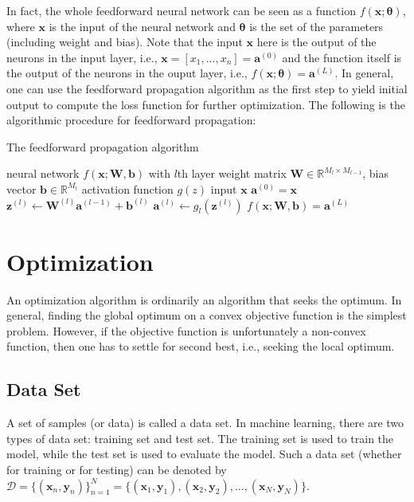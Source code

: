 \documentclass[
	parskip, 			   %
	twoside, 			   %
	DIV=14, 			   %
	BCOR=15.0mm, 		   %
	headsepline, 		   %
	open=right, 		   %
	captions=tableheading, %
	bibliography=totoc,    %
	numbers=noenddot       %
]{scrreprt}
\begin{document}
In fact, the whole feedforward neural network can be seen as a function $f(\mathbf{x};\mathbf{\theta})$, where $\mathbf{x}$ is the input of the neural network and $\mathbf{\theta}$ is the set of the parameters (including weight and bias). Note that the input $\mathbf{x}$ here is the output of the neurons in the input layer, i.e., $\mathbf{x}=[x_1, ..., x_n]=\mathbf{a}^{(0)}$ and the function itself is the output of the neurons in the ouput layer, i.e., $f(\mathbf{x};\mathbf{\theta})=\mathbf{a}^{(L)}$. In general, one can use the feedforward propagation algorithm as the first step to yield initial output to compute the loss function for further optimization. The following is the algorithmic procedure for feedforward propagation:

\clearpage
\begin{algorithm}[h!]
\caption{The feedforward propagation algorithm}
\label{alg:feedforward_alg}
    \begin{algorithmic}
    \Require neural network $f(\mathbf{x};\mathbf{W},\mathbf{b})$ with $l$th layer
    \Require weight matrix $\mathbf{W} \in \mathbb{R}^{M_{l} \times M_{l-1}}$, bias vector $\mathbf{b} \in \mathbb{R}^{M_{l}}$
    \Require activation function $g(z)$
    \Require input $\mathbf{x}$
    \State $\mathbf{a}^{(0)}=\mathbf{x}$ 
            \State $\mathbf{z}^{(l)} \gets \mathbf{W}^{(l)} \mathbf{a}^{(l-1)} + \mathbf{b}^{(l)}$ 
            \State $\mathbf{a}^{(l)} \gets g_{l}(\mathbf{z}^{(l)})$  
            \State {}
        \EndFor
    \EndFor
    \State \Return $f(\mathbf{x};\mathbf{W},\mathbf{b})=\mathbf{a}^{(L)}$ 
    \end{algorithmic}
\end{algorithm}

\section{Optimization}
An optimization algorithm is ordinarily an algorithm that seeks the optimum. In general, finding the global optimum on a convex objective function is the simplest problem. However, if the objective function is unfortunately a non-convex function, then one has to settle for second best, i.e., seeking the local optimum.

\subsection{Data Set}
A set of samples (or data) is called a data set. In machine learning, there are two types of data set: training set and test set. The training set is used to train the model, while the test set is used to evaluate the model. Such a data set (whether for training or for testing) can be denoted by $\mathcal{D}=\{ (\mathbf{x}_{n}, \mathbf{y}_{n}) \}_{n=1}^{N} = \{ (\mathbf{x}_{1}, \mathbf{y}_{1}),  (\mathbf{x}_{2}, \mathbf{y}_{2}), ..., (\mathbf{x}_{N}, \mathbf{y}_{N}) \}$.
\end{document}

